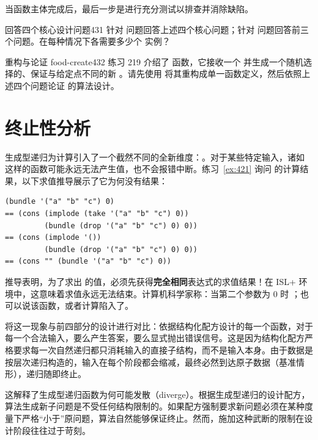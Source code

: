 当函数主体完成后，最后一步是进行充分测试以排查并消除缺陷。

\begin{exercise}{回答四个核心设计问题}{431}\label{ex:431}
针对  问题回答上述四个核心问题；针对  问题回答前三个问题。在每种情况下各需要多少个  实例？
\end{exercise}

\begin{exercise}{重构与论证 food-create}{432}\label{ex:432}
练习 219 介绍了  函数，它接收一个  并生成一个随机选择的、保证与给定点不同的新 。请先使用  将其重构成单一函数定义，然后依照上述四个问题论证  的算法设计。
\end{exercise}

\section{终止性分析}
\label{sec:26_2}

生成型递归为计算引入了一个截然不同的全新维度：。对于某些特定输入，诸如  这样的函数可能永远无法产生值，也不会报错中断。练习~\ref{ex:421} 询问  的计算结果，以下求值推导展示了它为何没有结果：

\begin{lstlisting}[language=BSL]
  (bundle '("a" "b" "c") 0)
== (cons (implode (take '("a" "b" "c") 0))
         (bundle (drop '("a" "b" "c") 0) 0))
== (cons (implode '())
         (bundle (drop '("a" "b" "c") 0) 0))
== (cons "" (bundle '("a" "b" "c") 0))
\end{lstlisting}

推导表明，为了求出  的值，必须先获得\textbf{完全相同}表达式的求值结果！在 ISL+ 环境中，这意味着求值永远无法结束。计算机科学家称：当第二个参数为 0 时  ；也可以说该函数，或者计算陷入了。

将这一现象与前四部分的设计进行对比：依据结构化配方设计的每一个函数，对于每一个合法输入，要么产生答案，要么显式抛出错误信号。这是因为结构化配方严格要求每一次自然递归都只消耗输入的直接子结构，而不是输入本身。由于数据是按层次递归构造的，输入在每个阶段都会缩减，最终必然到达原子数据（基准情形），递归随即终止。

这解释了生成型递归函数为何可能发散（diverge）。根据生成型递归的设计配方，算法生成新子问题是不受任何结构限制的。如果配方强制要求新问题必须在某种度量下严格“小于”原问题，算法自然能够保证终止。然而，施加这种武断的限制在设计阶段往往过于苛刻。

